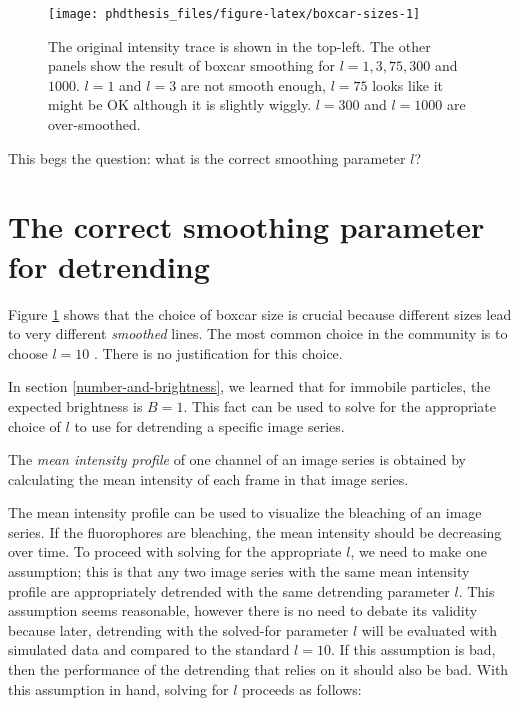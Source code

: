 \documentclass[12pt,]{book}
\theoremstyle{definition}
\theoremstyle{definition}
\theoremstyle{definition}
\theoremstyle{remark}
\let\BeginKnitrBlock\begin \let\EndKnitrBlock\end
\begin{document}
\begin{figure}

\texttt{[image: phdthesis\_files/figure-latex/boxcar-sizes-1]} \hfill{}

\caption{The original intensity trace is shown in the
top-left. The other panels show the result of boxcar smoothing for
\(l = 1, 3, 75, 300\) and \(1000\). \(l=1\) and \(l=3\) are not smooth
enough, \(l = 75\) looks like it might be OK although it is slightly
wiggly. \(l = 300\) and \(l = 1000\) are over-smoothed.}\label{fig:boxcar-sizes}
\end{figure}

This begs the question: what is the correct smoothing parameter \(l\)?

\section{The correct smoothing parameter for
detrending}\label{the-correct-smoothing-parameter-for-detrending}

Figure \ref{fig:boxcar-sizes} shows that the choice of boxcar size is
crucial because different sizes lead to very different \emph{smoothed}
lines. The most common choice in the community is to choose \(l = 10\)
\citep{SimFCS}. There is no justification for this choice.

In section \ref{number-and-brightness}, we learned that for immobile
particles, the expected brightness is \(B = 1\). This fact can be used
to solve for the appropriate choice of \(l\) to use for detrending a
specific image series.

\BeginKnitrBlock{definition}
\protect\hypertarget{def:unnamed-chunk-33}{}{\label{def:unnamed-chunk-33}
}The \emph{mean intensity profile} of one channel of an image series is
obtained by calculating the mean intensity of each frame in that image
series.
\EndKnitrBlock{definition}

The mean intensity profile can be used to visualize the bleaching of an
image series. If the fluorophores are bleaching, the mean intensity
should be decreasing over time. To proceed with solving for the
appropriate \(l\), we need to make one assumption; this is that any two
image series with the same mean intensity profile are appropriately
detrended with the same detrending parameter \(l\). This assumption
seems reasonable, however there is no need to debate its validity
because later, detrending with the solved-for parameter \(l\) will be
evaluated with simulated data and compared to the standard \(l = 10\).
If this assumption is bad, then the performance of the detrending that
relies on it should also be bad. With this assumption in hand, solving
for \(l\) proceeds as follows:
\end{document}
